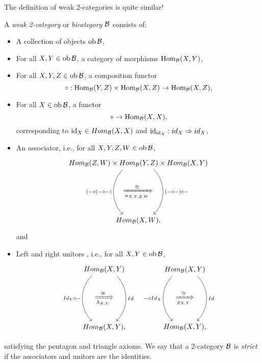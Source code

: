 The definition of weak 2-categories is quite similar!

\begin{dfn}
	A \emph{weak 2-category} or \emph{bicategory} $\mathcal{B}$ consists of:
	\begin{itemize}
		\item A collection of objects $\operatorname{ob} \mathcal{B}$,
		\item For all $X, Y \in \operatorname{ob} \mathcal{B}$, a category of morphisms $\operatorname{Hom}_{\mathcal{B}}(X, Y)$,
		\item For all $X, Y, Z \in \operatorname{ob} \mathcal{B}$, a composition functor 
		\begin{equation*}
			\circ: \operatorname{Hom}_{\mathcal{B}}(Y, Z) \times \operatorname{Hom}_{\mathcal{B}}(X, Z) \to \operatorname{Hom}_{\mathcal{B}}(X,Z),
		\end{equation*}
		\item For all $X \in \operatorname{ob} \mathcal{B}$, a functor 
		$$* \to \operatorname{Hom}_{\mathcal{B}}(X, X),$$
		corresponding to $\operatorname{id}_X\in Hom_{\mathcal{B}}(X,X)$ and $\operatorname{id}_{\operatorname{id}_X}:id_X\Rightarrow id_X$,
		
		\item An associator, i.e., for all $X,Y,Z,W \in \operatorname{ob} \mathcal{B}$,
		\begin{equation*}
			\begin{tikzcd}
				Hom_{\Bc}(Z,W)\times Hom_{\Bc}(Y,Z) \times Hom_{\Bc}(X,Y) \arrow[dd, shift left=-3ex, out=-135,in=135,"(-\circ(-\circ -)"']\arrow[dd, shift left=3ex, out=-45,in=45, "(-\circ -)\circ -"]\\
				\xRightarrow[a_{X,Y,Z,W}]{\cong}\\
				Hom_{\Bc}(X,W),
			\end{tikzcd}
		\end{equation*}
		and
		\item Left and right unitors , i.e., for all $X,Y \in \operatorname{ob} \mathcal{B}$,
		\begin{equation*}
			\begin{aligned}
			\begin{tikzcd}
				Hom_{\Bc}(X,Y)\arrow[dd, shift left=-2ex, out=-135,in=135,"Id_Y \circ -"']\arrow[dd, shift left=2ex, out=-45,in=45, "Id"]\\
				\xRightarrow[\lambda_{X,Y}]{\cong}\\
				Hom_{\Bc}(X,Y),
			\end{tikzcd}
			&&\begin{tikzcd}
				Hom_{\Bc}(X,Y)\arrow[dd, shift left=-2ex, out=-135,in=135,"- \circ Id_X"']\arrow[dd, shift left=2ex, out=-45,in=45, "Id"]\\
				\xRightarrow[\rho_{X,Y}]{\cong}\\
				Hom_{\Bc}(X,Y),
			\end{tikzcd}
			\end{aligned}
		\end{equation*}
	\end{itemize}
	satisfying the pentagon and triangle axioms.
	We say that a 2-category $\mathcal{B}$ is \emph{strict} if the associators and unitors are the identities.
\end{dfn}

